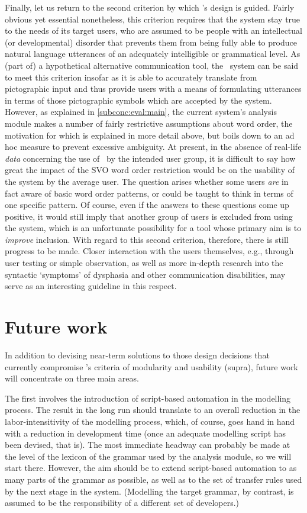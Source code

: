 Finally, let us return to the second criterion by which \depicto's design is
guided. Fairly obvious yet essential nonetheless, this criterion requires that
the system stay true to the needs of its target users, who are assumed to be
people with an intellectual (or developmental) disorder that prevents them from
being fully able to produce natural language utterances of an adequately
intelligible or grammatical level. As (part of) a hypothetical alternative
communication tool, the \depicto\ system can be said to meet this criterion
insofar as it is able to accurately translate from pictographic input and thus
provide users with a means of formulating utterances in terms of those
pictographic symbols which are accepted by the system. However, as explained in
\cref{subconc:eval:main}, the current system's analysis module makes a number
of fairly restrictive assumptions about word order, the motivation for which is
explained in more detail above, but boils down to an ad hoc measure to prevent
excessive ambiguity. At present, in the absence of real-life \emph{data}
concerning the use of \sclera\ by the intended user group, it is difficult to
say how great the impact of the SVO word order restriction would be on the
usability of the system by the average user. The question arises whether some
users \emph{are} in fact aware of basic word order patterns, or could be taught
to think in terms of one specific pattern. Of course, even if the answers to
these questions come up positive, it would still imply that another group of
users is excluded from using the system, which is an unfortunate possibility
for a tool whose primary aim is to \emph{improve} inclusion. With regard to
this second criterion, therefore, there is still progress to be made. Closer
interaction with the users themselves, e.g., through user testing or simple
observation, as well as more in-depth research into the syntactic `symptoms' of
dysphasia and other communication disabilities, may serve as an interesting
guideline in this respect.

\section{Future work}
\label{conc:futurework}

In addition to devising near-term solutions to those design decisions that
currently compromise \depicto's criteria of modularity and usability (supra),
future work will concentrate on three main areas.

The first involves the introduction of script-based automation in the modelling
process. The result in the long run should translate to an overall reduction in
the labor-intensitivity of the modelling process, which, of course, goes hand
in hand with a reduction in development time (once an adequate modelling script
has been devised, that is). The most immediate headway can probably be made at
the level of the lexicon of the grammar used by the analysis module, so we will
start there. However, the aim should be to extend script-based automation to as
many parts of the grammar as possible, as well as to the set of transfer rules
used by the next stage in the system. (Modelling the target grammar, by
contrast, is assumed to be the responsibility of a different set of
developers.)


